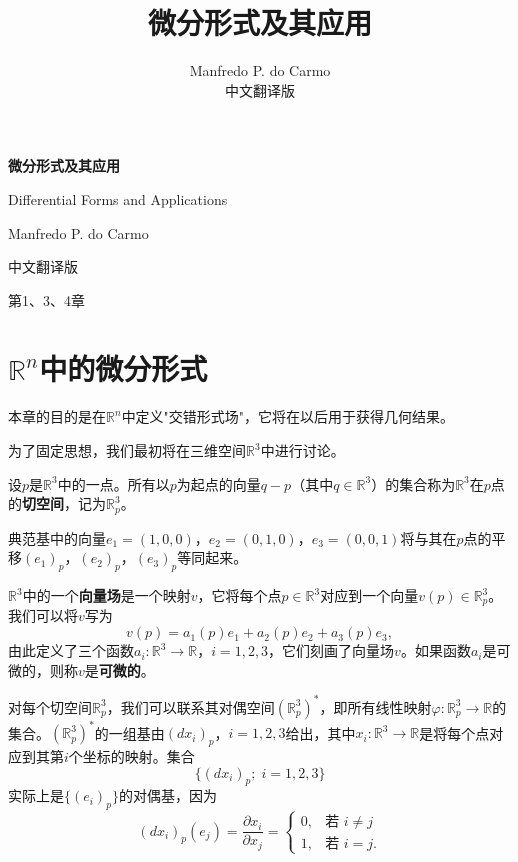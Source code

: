 \documentclass[12pt,a4paper]{ctexbook}
\title{\Huge\bfseries 微分形式及其应用}
\author{Manfredo P. do Carmo\\[1em] 中文翻译版}
\date{}
\begin{document}
\begin{titlepage}
    \centering
    \vspace*{3cm}
    {\Huge\bfseries 微分形式及其应用\par}
    \vspace{2cm}
    {\Large Differential Forms and Applications\par}
    \vspace{3cm}
    {\Large Manfredo P. do Carmo\par}
    \vspace{1cm}
    {\large 中文翻译版\par}
    \vspace{4cm}
    {\large 第1、3、4章\par}
    \vfill
\end{titlepage}

\tableofcontents
\newpage

\chapter{$\mathbb{R}^n$中的微分形式}

本章的目的是在$\mathbb{R}^n$中定义"交错形式场"，它将在以后用于获得几何结果。

为了固定思想，我们最初将在三维空间$\mathbb{R}^3$中进行讨论。

设$p$是$\mathbb{R}^3$中的一点。所有以$p$为起点的向量$q-p$（其中$q\in\mathbb{R}^3$）的集合称为$\mathbb{R}^3$在$p$点的\textbf{切空间}，记为$\mathbb{R}_p^3$。

典范基中的向量$e_1=(1,0,0)$，$e_2=(0,1,0)$，$e_3=(0,0,1)$将与其在$p$点的平移$(e_1)_p$，$(e_2)_p$，$(e_3)_p$等同起来。

$\mathbb{R}^3$中的一个\textbf{向量场}是一个映射$v$，它将每个点$p\in\mathbb{R}^3$对应到一个向量$v(p)\in\mathbb{R}_p^3$。我们可以将$v$写为
$$v(p) = a_1(p)e_1 + a_2(p)e_2 + a_3(p)e_3,$$
由此定义了三个函数$a_i:\mathbb{R}^3\to\mathbb{R}$，$i=1,2,3$，它们刻画了向量场$v$。如果函数$a_i$是可微的，则称$v$是\textbf{可微的}。

对每个切空间$\mathbb{R}_p^3$，我们可以联系其对偶空间$(\mathbb{R}_p^3)^*$，即所有线性映射$\varphi:\mathbb{R}_p^3\to\mathbb{R}$的集合。$(\mathbb{R}_p^3)^*$的一组基由$(dx_i)_p$，$i=1,2,3$给出，其中$x_i:\mathbb{R}^3\to\mathbb{R}$是将每个点对应到其第$i$个坐标的映射。集合
$$\{(dx_i)_p;\; i=1,2,3\}$$
实际上是$\{(e_i)_p\}$的对偶基，因为
$$(dx_i)_p(e_j) = \frac{\partial x_i}{\partial x_j} = \begin{cases} 0, & \text{若 } i\neq j \\ 1, & \text{若 } i=j. \end{cases}$$
\end{document}

